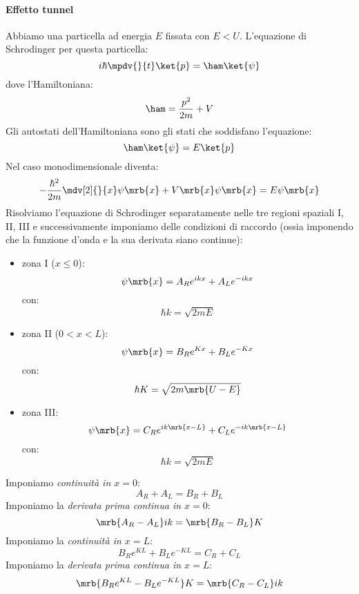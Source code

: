 \paragraph{Effetto tunnel}
Abbiamo una particella ad energia $E$ fissata con $E < U$. L'equazione di
Schrodinger per questa particella:
\[
  i \hbar \mpdv{}{t} \ket{p} = \ham \ket{\psi}
\]
dove l'Hamiltoniana:
\[
  \ham = \frac{p^2}{2m} + V
\]
Gli autostati dell'Hamiltoniana sono gli stati che soddisfano l'equazione:
\[
  \ham \ket{\psi} = E \ket{p}
\]
Nel caso monodimensionale diventa:
\[
  - \frac{\hbar^2}{2m} \mdv[2]{}{x} \psi \mrb{x} + V \mrb{x} \psi \mrb{x} = E
  \psi \mrb{x}
\]
Risolviamo l'equazione di Schrodinger separatamente nelle tre regioni spaziali
I, II, III e successivamente imponiamo delle condizioni di raccordo (ossia
imponendo che la funzione d'onda e la sua derivata siano continue):
\begin{itemize}
  \item zona I ($x \leq 0$):
    \[
      \psi \mrb{x} = A_R e^{ikx} + A_L e^{-ikx}
    \]
    con:
    \[
      \hbar k = \sqrt{2m E}
    \]
  \item zona II ($0 < x < L$):
    \[
      \psi \mrb{x} = B_R e^{Kx} + B_L e^{-Kx}
    \]
    con:
    \[
      \hbar K = \sqrt{2m \mrb{U - E}}
    \]
  \item zona III:
    \[
      \psi \mrb{x} = C_R e^{ik \mrb{x - L}} + C_L e^{-ik \mrb{x - L}}
    \]
    con:
    \[
      \hbar k = \sqrt{2m E}
    \]
\end{itemize}

Imponiamo \textit{continuità in $x = 0$}:
\[
  A_R + A_L = B_R + B_L
\]
Imponiamo la \textit{derivata prima continua in $x = 0$}:
\[
  \mrb{A_R - A_L} ik = \mrb{B_R - B_L} K
\]
Imponiamo la \textit{continuità in $x = L$}:
\[
  B_R e^{KL} + B_L e^{-KL} = C_R + C_L
\]
Imponiamo la \textit{derivata prima continua in $x = L$}:
\[
  \mrb{B_R e^{KL} - B_L e^{-KL}}K = \mrb{C_R - C_L} ik
\]

